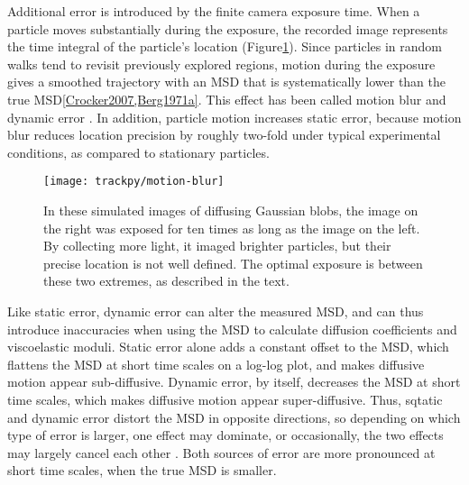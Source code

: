 Additional error is introduced by the finite  camera exposure time. When a particle moves substantially during the exposure, the recorded image represents the time integral of the particle's location (Figure\ref{fig:motion-blur}). Since particles in random walks tend to revisit previously explored regions, motion during the exposure gives a smoothed trajectory with an MSD that is systematically lower than the true MSD\ref{Crocker2007,Berg1971a}. This effect has been called motion blur and dynamic error \cite{Savin2005}. In addition, particle motion increases static error, because motion blur reduces location precision by roughly two-fold under typical experimental conditions, as compared to stationary particles\cite{Deschout2012}.

   \begin{figure}
    \centering
    \texttt{[image: trackpy/motion-blur]}
    \caption{\label{fig:motion-blur}In these simulated images of diffusing Gaussian blobs, the image on the right was exposed for ten times as long as the image on the left. By collecting more light, it imaged brighter particles, but their precise location is not well defined. The optimal exposure is between these two extremes, as described in the text.}
    \end{figure}

Like static error, dynamic error can alter the measured MSD, and can thus introduce inaccuracies when using the MSD to calculate diffusion coefficients and viscoelastic moduli. Static error alone adds a constant offset to the MSD, which flattens the MSD at short time scales on a log-log plot, and makes diffusive motion appear sub-diffusive\cite{Martin2002a}. Dynamic error, by itself, decreases the MSD at short time scales, which makes diffusive motion appear super-diffusive. Thus, sqtatic and dynamic error distort the MSD in opposite directions, so depending on which type of error is larger, one effect may dominate, or occasionally, the two effects may largely cancel each other \cite{Savin2005}. Both sources of error are more pronounced at short time scales, when the true MSD is smaller.

